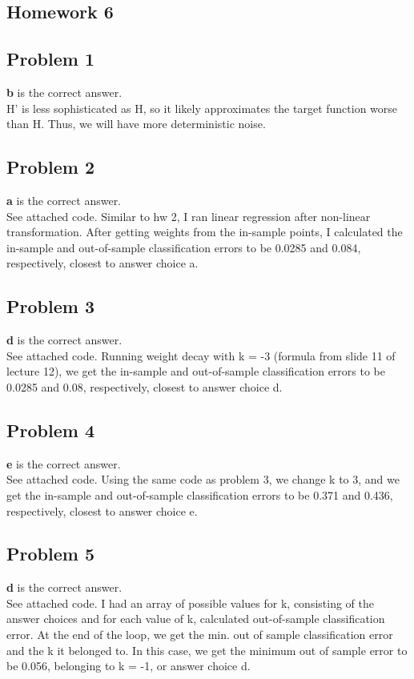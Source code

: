 \documentclass[12 pt]{article}
\begin{document}
	\begin{center}
		\section*{Homework 6}
	\end{center}
	
	
	\subsection*{Problem 1}	
	\textbf{b} is the correct answer. \\
	H' is less sophisticated as H, so it likely approximates the target function worse than H. Thus, we will have more deterministic noise.

	
	\subsection*{Problem 2}
	\textbf{a} is the correct answer. \\
	See attached code. Similar to hw 2, I ran linear regression after non-linear transformation. After getting weights from the in-sample points, I calculated the in-sample and out-of-sample classification errors to be 0.0285 and 0.084, respectively, closest to answer choice a.
	
	\subsection*{Problem 3}
	\textbf{d} is the correct answer.\\
	See attached code. Running weight decay with k = -3 (formula from slide 11 of lecture 12), we get the in-sample and out-of-sample classification errors to be 0.0285 and 0.08, respectively, closest to answer choice d.
	
	\subsection*{Problem 4}
	\textbf{e} is the correct answer.\\
	See attached code. Using the same code as problem 3, we change k to 3, and we get the in-sample and out-of-sample classification errors to be 0.371 and 0.436, respectively, closest to answer choice e.

	\subsection*{Problem 5}
	\textbf{d} is the correct answer.\\
	See attached code. I had an array of possible values for k, consisting of the answer choices and for each value of k, calculated out-of-sample classification error. At the end of the loop, we get the min. out of sample classification error and the k it belonged to. In this case, we get the minimum out of sample error to be 0.056, belonging to k = -1, or answer choice d.
		
\end{document}
